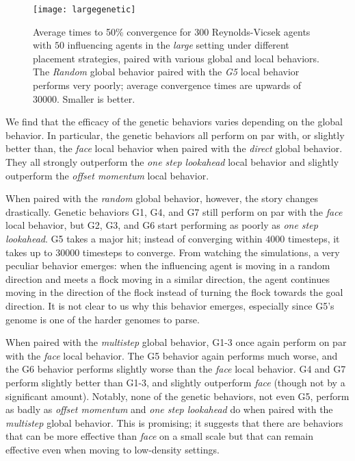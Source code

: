 \begin{figure}
    \centering
    \texttt{[image: largegenetic]}
    \caption{Average times to 50\% convergence for $300$ Reynolds-Vicsek agents
    with $50$ influencing agents in the \textit{large} setting under different
    placement strategies, paired with various global and local behaviors.
    The \textit{Random} global behavior paired with the \textit{G5} local behavior
    performs very poorly; average convergence times are upwards of $30000$.
    Smaller is better.}
    \label{fig:largegenetic}
\end{figure}
We find that the efficacy of the genetic behaviors varies depending
on the global behavior.
In particular, the genetic behaviors all perform on par with, or slightly
better than, the \textit{face} local behavior when paired with the \textit{direct}
global behavior.
They all strongly outperform the \textit{one step lookahead} local behavior and
slightly outperform the \textit{offset momentum} local behavior.

When paired with the \textit{random} global behavior, however, the story changes
drastically.
Genetic behaviors G1, G4, and G7 still perform on par with the \textit{face} local
behavior, but G2, G3, and G6 start performing as poorly as \textit{one step
lookahead}.
G5 takes a major hit; instead of converging within $4000$ timesteps, it takes up to
$30000$ timesteps to converge.
From watching the simulations, a very peculiar behavior emerges: when the
influencing agent is moving in a random direction and meets a flock moving in a
similar direction, the agent continues moving in the direction of the flock
instead of turning the flock towards the goal direction.
It is not clear to us why this behavior emerges, especially since G5's genome
is one of the harder genomes to parse.

When paired with the \textit{multistep} global behavior, G1-3 once again
perform on par with the \textit{face} local behavior.
The G5 behavior again performs much worse, and the G6 behavior performs slightly
worse than the \textit{face} local behavior.
G4 and G7 perform slightly better than G1-3, and slightly outperform \textit{face}
(though not by a significant amount).
Notably, none of the genetic behaviors, not even G5, perform as badly as \textit{
offset momentum} and \textit{one step lookahead} do when paired with the
\textit{multistep} global behavior.
This is promising; it suggests that there are behaviors that can be more effective
than \textit{face} on a small scale but that can remain effective even when moving
to low-density settings.

